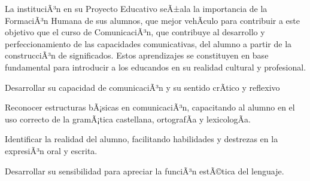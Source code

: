 \begin{syllabus}


\begin{justification}
La instituciÃ³n en su Proyecto Educativo seÃ±ala la importancia de la FormaciÃ³n Humana de sus alumnos, que mejor vehÃ­culo para contribuir a este objetivo que el curso de ComunicaciÃ³n, que contribuye al desarrollo y perfeccionamiento de las capacidades comunicativas, del alumno a partir de la construcciÃ³n de significados. Estos aprendizajes se constituyen en base fundamental para introducir a los educandos en su realidad cultural y profesional.
\end{justification}

\begin{goals}
\item Desarrollar su capacidad de comunicaciÃ³n y su sentido crÃ­tico y reflexivo
\item Reconocer estructuras bÃ¡sicas en comunicaciÃ³n, capacitando al alumno en el uso correcto de la gramÃ¡tica castellana, ortografÃ­a y lexicologÃ­a.
\item Identificar la realidad del alumno, facilitando habilidades y destrezas en la expresiÃ³n oral y escrita.
\item Desarrollar su sensibilidad para apreciar la funciÃ³n estÃ©tica del lenguaje.
\end{goals}

\begin{outcomes}
\end{outcomes}


\end{syllabus}
